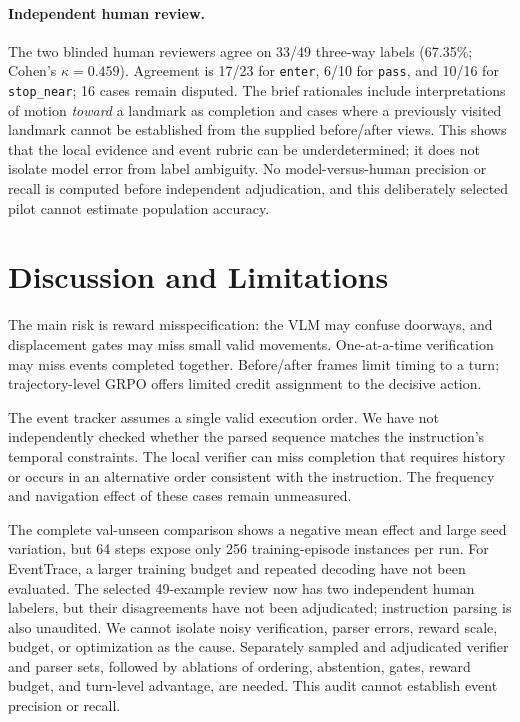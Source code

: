 \documentclass[10pt,twocolumn,letterpaper]{article}
\begin{document}
\paragraph{Independent human review.} The two blinded human reviewers agree on 33/49 three-way labels (67.35\%; Cohen's $\kappa=0.459$). Agreement is 17/23 for \texttt{enter}, 6/10 for \texttt{pass}, and 10/16 for \texttt{stop\_near}; 16 cases remain disputed. The brief rationales include interpretations of motion \emph{toward} a landmark as completion and cases where a previously visited landmark cannot be established from the supplied before/after views. This shows that the local evidence and event rubric can be underdetermined; it does not isolate model error from label ambiguity. No model-versus-human precision or recall is computed before independent adjudication, and this deliberately selected pilot cannot estimate population accuracy.

\section{Discussion and Limitations}
The main risk is reward misspecification: the VLM may confuse doorways, and displacement gates may miss small valid movements. One-at-a-time verification may miss events completed together. Before/after frames limit timing to a turn; trajectory-level GRPO offers limited credit assignment to the decisive action.

The event tracker assumes a single valid execution order. We have not
independently checked whether the parsed sequence matches the instruction's
temporal constraints. The local verifier can miss completion that requires
history or occurs in an alternative order consistent with the instruction.
The frequency and navigation effect of these cases remain unmeasured.

The complete val-unseen comparison shows a negative mean effect and large seed variation, but 64 steps expose only 256 training-episode instances per run. For EventTrace, a larger training budget and repeated decoding have not been evaluated. The selected 49-example review now has two independent human labelers, but their disagreements have not been adjudicated; instruction parsing is also unaudited. We cannot isolate noisy verification, parser errors, reward scale, budget, or optimization as the cause. Separately sampled and adjudicated verifier and parser sets, followed by ablations of ordering, abstention, gates, reward budget, and turn-level advantage, are needed. This audit cannot establish event precision or recall.
\end{document}
